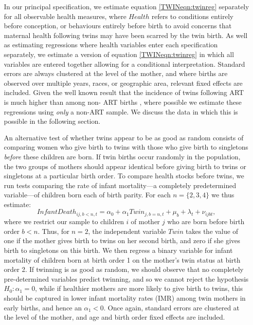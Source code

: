 \documentclass[subeqn]{article}
\begin{document}
\begin{spacing}{1.4}
In our principal specification, we estimate equation \ref{TWINeqn:twinreg}
separately for all observable health measures, where $Health$ refers to
conditions entirely before conception, or behaviours entirely before birth to
avoid concerns that maternal health following twins may have been scarred by the
twin birth.  As well as estimating regressions where health variables enter
each specification separately, we estimate a version of equation
\ref{TWINeqn:twinreg} in which all variables are entered together allowing for
a conditional interpretation.  Standard errors are always clustered at the
level of the mother, and where births are observed over multiple years, races,
or geographic area, relevant fixed effects are included.  Given the well known
result that the incidence of twins following ART is much higher than among non-%
ART births \citep{Vitthalaetal2009}, where possible we estimate these
regressions using \emph{only} a non-ART sample.  We discuss the data in which
this is possible in the following section.

An alternative test of whether twins appear to be as good as random consists of
comparing women who give birth to twins with those who give birth to singletons
\emph{before} these children are born.  If twin births occur randomly in the
population, the two groups of mothers should appear identical before giving
birth to twins or singletons at a particular birth order. To compare health
stocks before twins, we run tests comparing the rate of infant mortality---a
completely predetermined variable---of children born each of birth parity. For
each $n=\{2,3,4\}$ we thus estimate:
\begin{equation}
  \label{TWINeqn:twinIMR}
  InfantDeath_{ij,b<n,t}=\alpha_0 + \alpha_1 Twin_{j,b=n,t} + \mu_b + \lambda_t
                        +\nu_{ijbt},
\end{equation}
where we restrict our sample to children $i$ of mother $j$ who are born before
birth order $b<n$.  Thus, for $n=2$, the independent variable $Twin$ takes the
value of one if the mother gives birth to twins on her second birth, and zero if
she gives birth to singletons on this birth.  We then regress a binary variable
for infant mortality of children born at birth order 1 on the mother's twin
status at birth order 2. If twinning is as good as random, we should observe
that no completely pre-determined variables predict twinning, and so we cannot
reject the hypothesis $H_0: \alpha_1=0$, while if healthier mothers are more
likely to give birth to twins, this should be captured in lower infant mortality
rates (IMR) among twin mothers in early births, and hence an $\alpha_1<0$. Once
again, standard errors are clustered at the level of the mother, and age and
birth order fixed effects are included.



\end{spacing}
\end{document}

